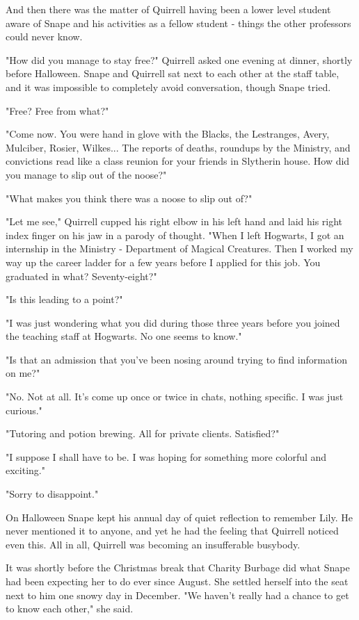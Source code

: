 And then there was the matter of Quirrell having been a lower level student aware of Snape and his activities as a fellow student - things the other professors could never know.

"How did you manage to stay free?" Quirrell asked one evening at dinner, shortly before Halloween. Snape and Quirrell sat next to each other at the staff table, and it was impossible to completely avoid conversation, though Snape tried.

"Free? Free from what?"

"Come now. You were hand in glove with the Blacks, the Lestranges, Avery, Mulciber, Rosier, Wilkes... The reports of deaths, roundups by the Ministry, and convictions read like a class reunion for your friends in Slytherin house. How did you manage to slip out of the noose?"

"What makes you think there was a noose to slip out of?"

"Let me see," Quirrell cupped his right elbow in his left hand and laid his right index finger on his jaw in a parody of thought. "When I left Hogwarts, I got an internship in the Ministry - Department of Magical Creatures. Then I worked my way up the career ladder for a few years before I applied for this job. You graduated in what? Seventy-eight?"

"Is this leading to a point?"

"I was just wondering what you did during those three years before you joined the teaching staff at Hogwarts. No one seems to know."

"Is that an admission that you've been nosing around trying to find information on me?"

"No. Not at all. It's come up once or twice in chats, nothing specific. I was just curious."

"Tutoring and potion brewing. All for private clients. Satisfied?"

"I suppose I shall have to be. I was hoping for something more colorful and exciting."

"Sorry to disappoint."

On Halloween Snape kept his annual day of quiet reflection to remember Lily. He never mentioned it to anyone, and yet he had the feeling that Quirrell noticed even this. All in all, Quirrell was becoming an insufferable busybody.

It was shortly before the Christmas break that Charity Burbage did what Snape had been expecting her to do ever since August. She settled herself into the seat next to him one snowy day in December. "We haven't really had a chance to get to know each other," she said.

